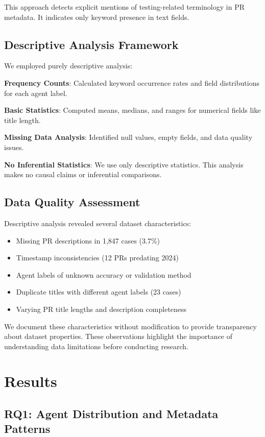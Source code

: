 \documentclass[conference]{IEEEtran}
\begin{document}
This approach detects explicit mentions of testing-related terminology in PR metadata. It indicates only keyword presence in text fields.

\subsection{Descriptive Analysis Framework}

We employed purely descriptive analysis:

\textbf{Frequency Counts}: Calculated keyword occurrence rates and field distributions for each agent label.

\textbf{Basic Statistics}: Computed means, medians, and ranges for numerical fields like title length.

\textbf{Missing Data Analysis}: Identified null values, empty fields, and data quality issues.

\textbf{No Inferential Statistics}: We use only descriptive statistics. This analysis makes no causal claims or inferential comparisons.

\subsection{Data Quality Assessment}

Descriptive analysis revealed several dataset characteristics:
\begin{itemize}
    \item Missing PR descriptions in 1,847 cases (3.7\%)
    \item Timestamp inconsistencies (12 PRs predating 2024)
    \item Agent labels of unknown accuracy or validation method
    \item Duplicate titles with different agent labels (23 cases)
    \item Varying PR title lengths and description completeness
\end{itemize}

We document these characteristics without modification to provide transparency about dataset properties. These observations highlight the importance of understanding data limitations before conducting research.

\section{Results}

\subsection{RQ1: Agent Distribution and Metadata Patterns}
\end{document}
